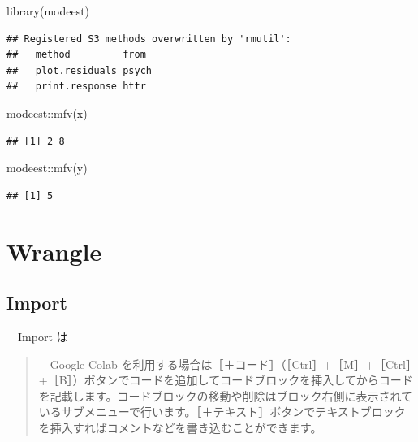 \documentclass[
  12pt,
]{book}
\newenvironment{Shaded}{\begin{snugshade}}{\end{snugshade}}
\newcommand{\FunctionTok}[1]{\textcolor[rgb]{0.00,0.00,0.00}{#1}}
\newcommand{\NormalTok}[1]{#1}
\newcommand{\SpecialCharTok}[1]{\textcolor[rgb]{0.00,0.00,0.00}{#1}}
\begin{document}
\begin{Shaded}
\begin{Highlighting}[]
\FunctionTok{library}\NormalTok{(modeest)}
\end{Highlighting}
\end{Shaded}

\begin{verbatim}
## Registered S3 methods overwritten by 'rmutil':
##   method         from 
##   plot.residuals psych
##   print.response httr
\end{verbatim}

\begin{Shaded}
\begin{Highlighting}[]
\NormalTok{modeest}\SpecialCharTok{::}\FunctionTok{mfv}\NormalTok{(x)}
\end{Highlighting}
\end{Shaded}

\begin{verbatim}
## [1] 2 8
\end{verbatim}

\begin{Shaded}
\begin{Highlighting}[]
\NormalTok{modeest}\SpecialCharTok{::}\FunctionTok{mfv}\NormalTok{(y)}
\end{Highlighting}
\end{Shaded}

\begin{verbatim}
## [1] 5
\end{verbatim}

\hypertarget{part-wrangle}{%
\part{Wrangle}\label{part-wrangle}}

\hypertarget{import-2}{%
\chapter{Import}\label{import-2}}

　Import は

\begin{quote}
　Google Colab を利用する場合は［＋コード］（［Ctrl］+［M］+［Ctrl］+［B］）ボタンでコードを追加してコードブロックを挿入してからコードを記載します。コードブロックの移動や削除はブロック右側に表示されているサブメニューで行います。［＋テキスト］ボタンでテキストブロックを挿入すればコメントなどを書き込むことができます。
\end{quote}
\end{document}
